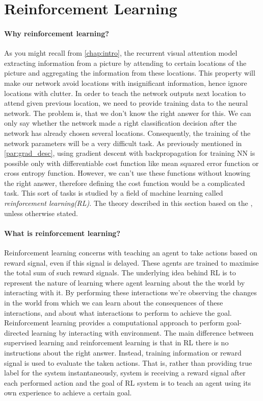 
\section{Reinforcement Learning}
\paragraph{Why reinforcement learning?}
As you might recall from \autoref{chap:intro}, the recurrent visual attention model
extracting information from a picture by attending to certain locations of the picture
and aggregating the information from these locations. This property will make our network
avoid locations with insignificant information, hence ignore locations with clutter.
In order to teach the network
outputs next location to attend given previous location, we need to provide training data to
the neural network. The problem is, that we don't know the right answer for this.
We can only say whether the network made a right classification decision after the network
has already chosen several locations. Consequently, the training of the network parameters will
be a very difficult task. As previously mentioned in \autoref{par:grad_desc}, using gradient descent
with backpropagation for training NN is possible only with differentiable cost function like
mean squared error function or cross entropy function. However, we can't use these functions without
knowing the right answer, therefore defining the cost function would be a complicated task.
This sort of tasks is studied by a field of machine learning called \emph{reinforcement
learning(RL)}. The theory described in this section based on the
\cite{Sutton2012}, unless otherwise stated.

\paragraph{What is reinforcement learning?}
Reinforcement learning concerns with teaching an agent to take actions based on
reward signal, even if this signal is delayed.
These agents are trained to maximise the total
sum of such reward signals.
The underlying idea behind RL is to
represent the nature of learning where agent learning about the the world by interacting
with it. By performing these interactions we're observing the changes in the world
from which we can learn about the consequences of these
interactions, and about what interactions to perform to achieve the goal.
Reinforcement learning provides a computational approach to perform goal-directed learning
by interacting with environment. The main difference between supervised learning and
reinforcement learning is that in RL there is no instructions about the right answer.
Instead, training information or reward signal is used to evaluate the taken actions.
That is, rather than providing true label for the system instantaneously,
system is receiving a reward signal
after each performed action and the goal of RL system is to teach an agent using its own
experience to achieve a certain goal.

